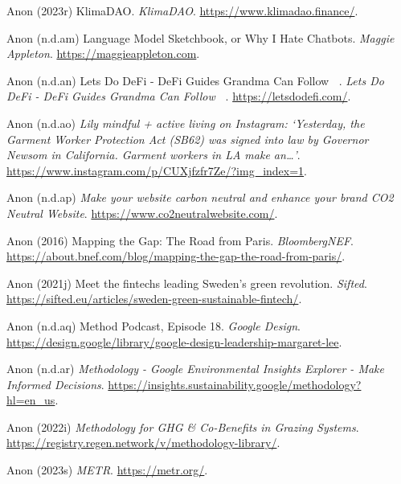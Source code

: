 \documentclass[
  letterpaper,
  DIV=11,
  numbers=noendperiod]{scrartcl}
\newlength{\cslhangindent}
\newenvironment{CSLReferences}[2] %
 {\begin{list}{}{%
  \setlength{\itemindent}{0pt}
  \setlength{\leftmargin}{0pt}
  \setlength{\parsep}{0pt}
  \ifodd #1
   \setlength{\leftmargin}{\cslhangindent}
   \setlength{\itemindent}{-1\cslhangindent}
  \fi
  \setlength{\itemsep}{#2\baselineskip}}}
 {\end{list}}
\begin{document}
\begin{CSLReferences}{0}{1}
Anon (2023r) {KlimaDAO}. \emph{KlimaDAO}.
\url{https://www.klimadao.finance/}.

Anon (n.d.am) Language {Model Sketchbook}, or {Why I Hate Chatbots}.
\emph{Maggie Appleton}. \url{https://maggieappleton.com}.

Anon (n.d.an) Lets {Do DeFi} - {DeFi Guides Grandma Can Follow} 👵🏻.
\emph{Lets Do DeFi - DeFi Guides Grandma Can Follow 👵🏻}.
\url{https://letsdodefi.com/}.

Anon (n.d.ao) \emph{Lily {\textbar} mindful + active living on
{Instagram}: {`{Yesterday}, the {Garment Worker Protection Act} ({SB62})
was signed into law by {Governor Newsom} in {California}. {Garment}
workers in {LA} make an{\ldots{}}'}}.
\url{https://www.instagram.com/p/CUXjfzfr7Ze/?img_index=1}.

Anon (n.d.ap) \emph{Make your website carbon neutral and enhance your
brand {\textbar} {CO2 Neutral Website}}.
\url{https://www.co2neutralwebsite.com/}.

Anon (2016) Mapping the {Gap}: The {Road} from {Paris}.
\emph{BloombergNEF}.
\url{https://about.bnef.com/blog/mapping-the-gap-the-road-from-paris/}.

Anon (2021j) Meet the fintechs leading {Sweden}'s green revolution.
\emph{Sifted}.
\url{https://sifted.eu/articles/sweden-green-sustainable-fintech/}.

Anon (n.d.aq) Method {Podcast}, {Episode} 18. \emph{Google Design}.
\url{https://design.google/library/google-design-leadership-margaret-lee}.

Anon (n.d.ar) \emph{Methodology - {Google Environmental Insights
Explorer} - {Make Informed Decisions}}.
\url{https://insights.sustainability.google/methodology?hl=en_us}.

Anon (2022i) \emph{Methodology for {GHG} \& {Co-Benefits} in {Grazing
Systems}}. \url{https://registry.regen.network/v/methodology-library/}.

Anon (2023s) \emph{{METR}}. \url{https://metr.org/}.


\end{CSLReferences}
\end{document}
